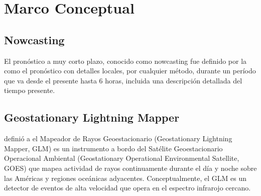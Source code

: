 \section{Marco Conceptual}

\subsection{Nowcasting}
El pronóstico a muy corto plazo, conocido como nowcasting fue definido por la
\cite{wmo2017} como el pronóstico con detalles locales, por cualquier método, 
durante un período que va desde el presente hasta 6 horas, incluida una 
descripción detallada del tiempo presente.


\subsection{Geostationary Lightning Mapper}
\cite{GOODMAN201334} definió a el Mapeador de Rayos Geoestacionario 
(Geostationary Lightning Mapper, GLM) es un instrumento a bordo del Satélite 
Geoestacionario Operacional Ambiental (Geostationary Operational Environmental 
Satellite, GOES) que mapea actividad de rayos continuamente durante el día y 
noche sobre las Américas y regiones oceánicas adyacentes. Conceptualmente, el 
GLM es un detector de eventos de alta velocidad que opera en el espectro 
infrarojo cercano.

